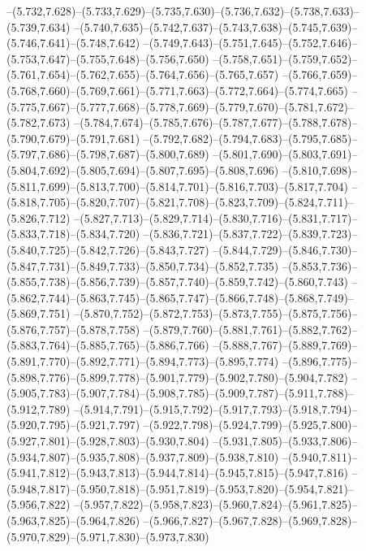   --(5.732,7.628)--(5.733,7.629)--(5.735,7.630)--(5.736,7.632)--(5.738,7.633)--(5.739,7.634)%
  --(5.740,7.635)--(5.742,7.637)--(5.743,7.638)--(5.745,7.639)--(5.746,7.641)--(5.748,7.642)%
  --(5.749,7.643)--(5.751,7.645)--(5.752,7.646)--(5.753,7.647)--(5.755,7.648)--(5.756,7.650)%
  --(5.758,7.651)--(5.759,7.652)--(5.761,7.654)--(5.762,7.655)--(5.764,7.656)--(5.765,7.657)%
  --(5.766,7.659)--(5.768,7.660)--(5.769,7.661)--(5.771,7.663)--(5.772,7.664)--(5.774,7.665)%
  --(5.775,7.667)--(5.777,7.668)--(5.778,7.669)--(5.779,7.670)--(5.781,7.672)--(5.782,7.673)%
  --(5.784,7.674)--(5.785,7.676)--(5.787,7.677)--(5.788,7.678)--(5.790,7.679)--(5.791,7.681)%
  --(5.792,7.682)--(5.794,7.683)--(5.795,7.685)--(5.797,7.686)--(5.798,7.687)--(5.800,7.689)%
  --(5.801,7.690)--(5.803,7.691)--(5.804,7.692)--(5.805,7.694)--(5.807,7.695)--(5.808,7.696)%
  --(5.810,7.698)--(5.811,7.699)--(5.813,7.700)--(5.814,7.701)--(5.816,7.703)--(5.817,7.704)%
  --(5.818,7.705)--(5.820,7.707)--(5.821,7.708)--(5.823,7.709)--(5.824,7.711)--(5.826,7.712)%
  --(5.827,7.713)--(5.829,7.714)--(5.830,7.716)--(5.831,7.717)--(5.833,7.718)--(5.834,7.720)%
  --(5.836,7.721)--(5.837,7.722)--(5.839,7.723)--(5.840,7.725)--(5.842,7.726)--(5.843,7.727)%
  --(5.844,7.729)--(5.846,7.730)--(5.847,7.731)--(5.849,7.733)--(5.850,7.734)--(5.852,7.735)%
  --(5.853,7.736)--(5.855,7.738)--(5.856,7.739)--(5.857,7.740)--(5.859,7.742)--(5.860,7.743)%
  --(5.862,7.744)--(5.863,7.745)--(5.865,7.747)--(5.866,7.748)--(5.868,7.749)--(5.869,7.751)%
  --(5.870,7.752)--(5.872,7.753)--(5.873,7.755)--(5.875,7.756)--(5.876,7.757)--(5.878,7.758)%
  --(5.879,7.760)--(5.881,7.761)--(5.882,7.762)--(5.883,7.764)--(5.885,7.765)--(5.886,7.766)%
  --(5.888,7.767)--(5.889,7.769)--(5.891,7.770)--(5.892,7.771)--(5.894,7.773)--(5.895,7.774)%
  --(5.896,7.775)--(5.898,7.776)--(5.899,7.778)--(5.901,7.779)--(5.902,7.780)--(5.904,7.782)%
  --(5.905,7.783)--(5.907,7.784)--(5.908,7.785)--(5.909,7.787)--(5.911,7.788)--(5.912,7.789)%
  --(5.914,7.791)--(5.915,7.792)--(5.917,7.793)--(5.918,7.794)--(5.920,7.795)--(5.921,7.797)%
  --(5.922,7.798)--(5.924,7.799)--(5.925,7.800)--(5.927,7.801)--(5.928,7.803)--(5.930,7.804)%
  --(5.931,7.805)--(5.933,7.806)--(5.934,7.807)--(5.935,7.808)--(5.937,7.809)--(5.938,7.810)%
  --(5.940,7.811)--(5.941,7.812)--(5.943,7.813)--(5.944,7.814)--(5.945,7.815)--(5.947,7.816)%
  --(5.948,7.817)--(5.950,7.818)--(5.951,7.819)--(5.953,7.820)--(5.954,7.821)--(5.956,7.822)%
  --(5.957,7.822)--(5.958,7.823)--(5.960,7.824)--(5.961,7.825)--(5.963,7.825)--(5.964,7.826)%
  --(5.966,7.827)--(5.967,7.828)--(5.969,7.828)--(5.970,7.829)--(5.971,7.830)--(5.973,7.830)%

